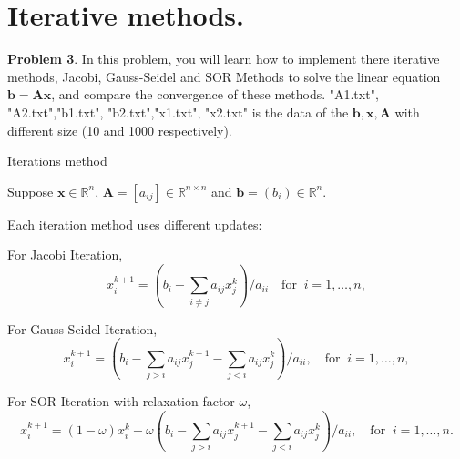 \documentclass[english,onecolumn]{IEEEtran}
\begin{document}
\clearpage
\newpage
\section{Iterative methods.}
\noindent\textbf{Problem 3}.
In this problem, you will learn how to implement there iterative methods, Jacobi, Gauss-Seidel and SOR Methods to solve the linear equation $\mathbf{b}=\mathbf{Ax}$, and compare the convergence of these methods. 
"A1.txt", "A2.txt","b1.txt", "b2.txt","x1.txt", "x2.txt" is the data of the $\mathbf{b}, \mathbf{x}, \mathbf{A}$ with different size (10 and 1000 respectively).
\begin{algorithm}
	\caption{Iterations method}
	\label{algo:Jacobi}
    \LinesNumbered
\end{algorithm}

Suppose $\mathbf{x}\in\mathbb{R}^{n}$, $\mathbf{A}=[a_{ij}]\in\mathbb{R}^{n\times n}$ and $\mathbf{b}=(b_i)\in\mathbb{R}^{n}$.

Each iteration method uses different updates:

For Jacobi Iteration, 
\begin{equation*}
    x_i^{k+1} = (b_i - \sum_{i \neq j} a_{ij}x_j^k) / a_{ii} \quad \text{for }\ i = 1,\dots, n,
\end{equation*}

For Gauss-Seidel Iteration, 
\begin{equation*}
    x_i^{k+1} = (b_i - \sum_{j > i} a_{ij}x_j^{k+1} - \sum_{j < i} a_{ij}x_j^{k}) / a_{ii}, \quad \text{for }\ i = 1,\dots, n,
\end{equation*}

For SOR Iteration with relaxation factor $\omega$, 
\begin{equation*}
    x_i^{k+1} = (1-\omega) x_i^{k} + \omega \left(b_i - \sum_{j>i} a_{ij}x_j^{k+1} - \sum_{j<i} a_{ij}x_j^{k}\right) / a_{ii}, \quad \text{for }\ i = 1,\dots, n.
\end{equation*}
\end{document}
